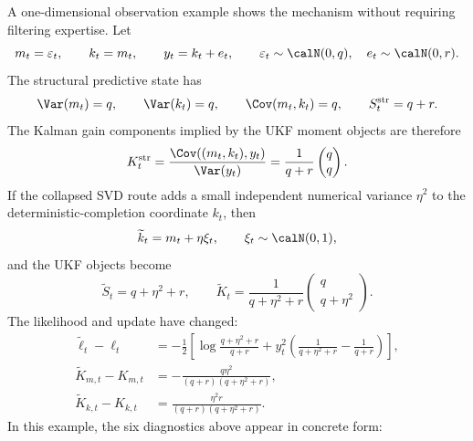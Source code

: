 A one-dimensional observation example shows the mechanism without requiring
filtering expertise.  Let
\[
  m_t=\varepsilon_t,\qquad k_t=m_t,\qquad
  y_t=k_t+e_t,\qquad
  \varepsilon_t\sim\calN(0,q),\quad e_t\sim\calN(0,r).
\]
The structural predictive state has
\[
  \Var(m_t)=q,\qquad
  \Var(k_t)=q,\qquad
  \Cov(m_t,k_t)=q,
  \qquad
  S_t^{\mathrm{str}}=q+r.
\]
The Kalman gain components implied by the UKF moment objects are therefore
\[
  K_t^{\mathrm{str}}
  =
  \frac{\Cov((m_t,k_t),y_t)}{\Var(y_t)}
  =
  \frac{1}{q+r}
  \begin{pmatrix}q\\ q\end{pmatrix}.
  \label{eq:bf-structural-gain-identity-example}
\]
If the collapsed SVD route adds a small independent numerical variance
$\eta^2$ to the deterministic-completion coordinate $k_t$, then
\[
  \widetilde k_t=m_t+\eta\xi_t,\qquad
  \xi_t\sim\calN(0,1),
\]
and the UKF objects become
\[
  \widetilde S_t=q+\eta^2+r,\qquad
  \widetilde K_t
  =
  \frac{1}{q+\eta^2+r}
  \begin{pmatrix}q\\ q+\eta^2\end{pmatrix}.
  \label{eq:bf-collapsed-gain-identity-example}
\]
The likelihood and update have changed:
\begin{align}
  \widetilde\ell_t-\ell_t
  &=
  -\frac12
  \left[
    \log\frac{q+\eta^2+r}{q+r}
    +
    y_t^2
    \left(\frac{1}{q+\eta^2+r}-\frac{1}{q+r}\right)
  \right],\\
  \widetilde K_{m,t}-K_{m,t}
  &=
  -\frac{q\eta^2}{(q+r)(q+\eta^2+r)},\\
  \widetilde K_{k,t}-K_{k,t}
  &=
  \frac{\eta^2 r}{(q+r)(q+\eta^2+r)} .
  \label{eq:bf-collapsed-ukf-likelihood-gain-change}
\end{align}
In this example, the six diagnostics above appear in concrete form:
